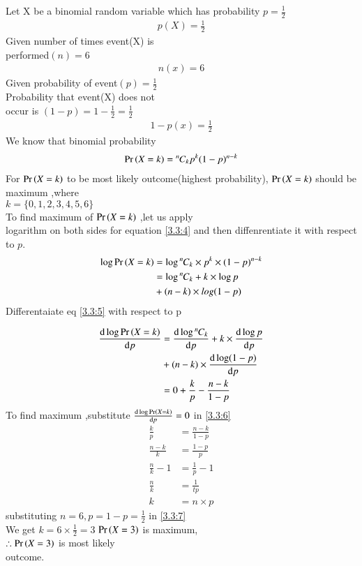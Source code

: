 Let X be a binomial random variable which has probability  $p=\frac{1}{2}$ 
 \begin{align}
p(X)=\frac{1}{2} \label{3.3:1}
 \end{align}
Given number of times event(X) is\\
 performed$(n)=6$
 \begin{align}
 n(x)=6 \label{3.3:2}
 \end{align}
Given probability of event$(p)= \frac{1}{2}$\\
Probability that event(X) does not \\occur is
$(1-p)=1-\frac{1}{2}=\frac{1}{2} $
 \begin{align}
1-p(x)=\frac{1}{2}\label{3.3:3}
 \end{align}
We know that binomial probability
\begin{align}
\Pr\left(X=k\right) = {{}^{n}\mkern-1muC_{k}} p^k({1-p})^{n-k}  \label{3.3:4} 
\end{align}
For $\Pr\left(X=k\right)$ to be most likely outcome(highest probability),
 $\Pr\left(X=k\right)$  should be maximum ,where\\
$ k=\{0,1,2,3,4,5,6\}$\\
To find maximum of  $\Pr\left(X=k\right)$  ,let us  apply \\logarithm on both sides for equation \eqref{3.3:4} and then diffenrentiate it with respect
to $p$.
\begin{align}
\log  \Pr\left(X=k\right) &=\log  {{}^{n}\mkern-1muC_{k}} \times p^k\times ({1-p})^{n-k} \\
&=\log {{}^{n}\mkern-1muC_{k}} +k \times \log p \notag \\
 &+(n-k)\times log (1-p) \label{3.3:5}
\end{align}
Differentaiate eq \eqref{3.3:5} with respect to p

\begin{align}
\frac{\mathrm{d} \log \Pr\left(X=k\right) }{\mathrm{d} p}&=\frac{\mathrm{d} \log  {{}^{n}\mkern-1muC_{k}} }{\mathrm{d}p}+k\times  \frac{\mathrm{d}\log p}{\mathrm{d} p} \\
     &+(n-k) \times \frac{\mathrm{d}\log (1-p)}{\mathrm{d} p} \notag \\
     &=0+\frac{k}{p}-\frac{n-k}{ 1-p} \label{3.3:6}
\end{align}
To find maximum ,substitute $\frac{\mathrm{d} \log  \Pr\left(X=k\right) }{\mathrm{d} p}=0$ in \eqref{3.3:6}
\begin{align}
\frac{k}{ p}&=\frac{n-k}{1-p}  \\
\frac{ n-k}{k}&=\frac{1-p}{ p}  \\
\frac{ n}{k}-1&=\frac{1}{ p}-1  \\
\frac{n}{ k}&=\frac{ 1}{t p}  \\
k&=n\times p \label{3.3:7}
\end{align}
substituting $n=6,p=1-p=\frac{1}{2}$ in \eqref{3.3:7}\\
We get $k=6\times \frac{1}{2}=3$
$\Pr\left(X=3\right)$ is maximum,\\
$\therefore\Pr\left(X=3\right)$ is most likely \\
outcome.\\